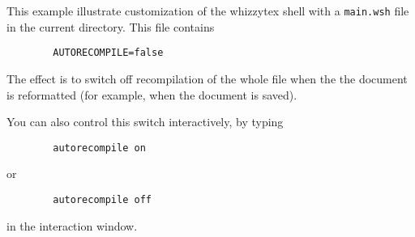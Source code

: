 \documentclass{article}
\begin{document}
This example illustrate customization of the whizzytex shell with a
\texttt{main.wsh} file in the current directory. This file contains
\begin{verbatim}
        AUTORECOMPILE=false
\end{verbatim}
The effect is to switch off recompilation of the whole file when the
the document is reformatted (for example, when the document is saved). 

You can also control this switch interactively, by typing
\begin{verbatim}
        autorecompile on
\end{verbatim}
or
\begin{verbatim}
        autorecompile off
\end{verbatim}
in the interaction window. 
\end{document}
